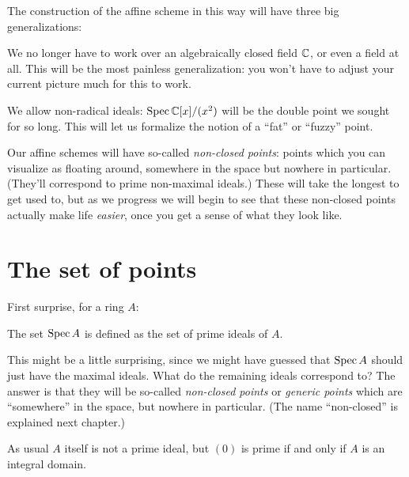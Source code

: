 The construction of the affine scheme in this way
will have three big generalizations:
\begin{enumerate}
	\ii We no longer have to work over an algebraically
	closed field $\mathbb C$, or even a field at all.
	This will be the most painless generalization:
	you won't have to adjust your current picture much for this to work.

	\ii We allow non-radical ideals:
	$\operatorname{Spec} \mathbb C[x] / (x^2)$ will be the double point
	we sought for so long.
	This will let us formalize the notion of a ``fat'' or ``fuzzy'' point.

	\ii Our affine schemes will have so-called \emph{non-closed points}:
	points which you can visualize as floating around,
	somewhere in the space but nowhere in particular.
	(They'll correspond to prime non-maximal ideals.)
	These will take the longest to get used to,
	but as we progress we will begin to see that these non-closed points
	actually make life \emph{easier},
	once you get a sense of what they look like.
\end{enumerate}

\section{The set of points}

First surprise, for a ring $A$:
\begin{definition}
	The set $\operatorname{Spec} A$ is defined as the set of prime ideals of $A$.
\end{definition}

This might be a little surprising, since we might have guessed
that $\operatorname{Spec} A$ should just have the maximal ideals.
What do the remaining ideals correspond to?
The answer is that they will be so-called \emph{non-closed points}
or \emph{generic points} which are ``somewhere'' in the space,
but nowhere in particular.
(The name ``non-closed'' is explained next chapter.)

\begin{remark}
	As usual $A$ itself is not a prime ideal, but $(0)$
	is prime if and only if $A$ is an integral domain.
\end{remark}

